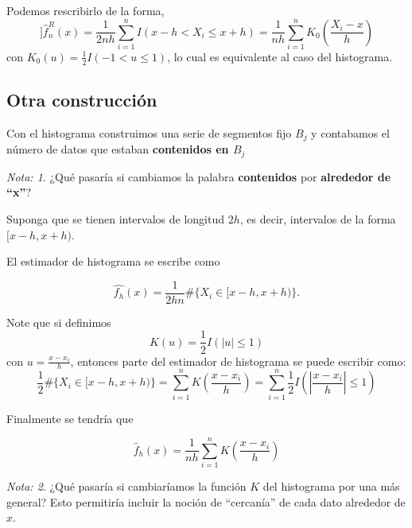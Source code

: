 \documentclass[
  12pt,
]{book}
\theoremstyle{definition}
\theoremstyle{definition}
\theoremstyle{definition}
\theoremstyle{definition}
\theoremstyle{remark}
\newtheorem*{remark}{Nota: }
\begin{document}
Podemos rescribirlo de la forma,
\[]
\hat{f}_{n}^{R}(x)=\frac{1}{2nh}\sum_{i=1}^{n}I(x-h<X_{i}\leq x+h)=\frac{1}{nh}\sum_{i=1}^{n}K_{0}\left(\frac{X_{i}-x}{h}\right)
\]
con \(K_{0}(u)=\frac{1}{2}I(-1<u\leq1)\), lo cual es equivalente al caso del histograma.

\hypertarget{otra-construcciuxf3n}{%
\subsection{Otra construcción}\label{otra-construcciuxf3n}}

Con el histograma construimos una serie de segmentos fijo \(B_{j}\) y contabamos el número de datos que estaban \textbf{contenidos en \(B_{j}\)}

\begin{remark}
¿Qué pasaría si cambiamos la palabra \textbf{contenidos} por \textbf{alrededor de ``x''}?
\end{remark}

Suponga que se tienen intervalos de longitud \(2h\), es decir, intervalos de la forma \([x-h,x+h)\).

El estimador de histograma se escribe como

\begin{equation*}
\hat{f_{h}}(x) = \dfrac{1}{2hn} \# \{ X_i \in [x-h,x+h) \}.
\end{equation*}

Note que si definimos
\begin{equation*}
K(u)=\frac{1}{2} I \left( \left\vert u \right\vert \leq 1 \right)
\end{equation*}
con \(u = \frac{x-x_i}{h}\), entonces parte del estimador de histograma se puede escribir como:
\begin{equation*}
\frac{1}{2}\# \{ X_i \in [x-h,x+h) \}
=\sum_{i=1}^{n} K\left( \frac{x-x_{i}}{h} \right)
=\sum_{i=1}^{n}  \frac{1}{2} I \left( \left\vert \frac{x-x_{i}}{h}
\right\vert \leq 1 \right)
\end{equation*}

Finalmente se tendría que

\begin{equation*}
\hat{f}_{h}\left( x \right) = \frac{1}{nh}\sum_{i=1}^{n} K\left( \frac{x-x_{i}}{h} \right)
\end{equation*}

\begin{remark}
¿Qué pasaría si cambiaríamos la función \(K\) del histograma por una más general? Esto permitiría incluir la noción de ``cercanía'' de cada dato alrededor de \(x\).
\end{remark}
\end{document}
